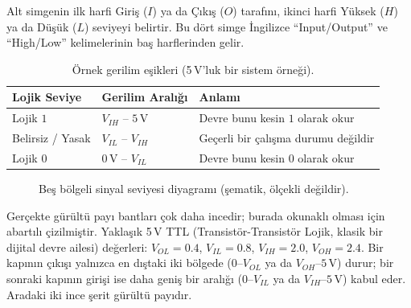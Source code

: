 Alt simgenin ilk harfi Giriş ($I$) ya da Çıkış ($O$) tarafını, ikinci harfi Yüksek ($H$) ya
da Düşük ($L$) seviyeyi belirtir. Bu dört simge İngilizce ``Input/Output'' ve ``High/Low''
kelimelerinin baş harflerinden gelir.

\begin{table}[h]
\centering
\begin{tabular}{lll}
\toprule
Lojik Seviye & Gerilim Aralığı & Anlamı \\
\midrule
Lojik $1$ & $V_{IH}$ -- $5\,\text{V}$ & Devre bunu kesin $1$ olarak okur \\
Belirsiz / Yasak & $V_{IL}$ -- $V_{IH}$ & Geçerli bir çalışma durumu değildir \\
Lojik $0$ & $0\,\text{V}$ -- $V_{IL}$ & Devre bunu kesin $0$ olarak okur \\
\bottomrule
\end{tabular}
\caption{Örnek gerilim eşikleri (5\,V'luk bir sistem örneği).}
\label{tab:gerilim-araliklari}
\end{table}

\begin{figure}[H]
\centering
{}
\caption{Beş bölgeli sinyal seviyesi diyagramı (şematik, ölçekli değildir).}
\label{fig:sinyal-seviyeleri}
\end{figure}

Gerçekte gürültü payı bantları çok daha incedir; burada okunaklı olması için abartılı
çizilmiştir. Yaklaşık 5\,V TTL (Transistör-Transistör Lojik, klasik bir dijital devre
ailesi) değerleri: $V_{OL}=0.4$, $V_{IL}=0.8$, $V_{IH}=2.0$, $V_{OH}=2.4$. Bir kapının
çıkışı yalnızca en dıştaki iki bölgede ($0$--$V_{OL}$ ya da $V_{OH}$--$5\,\text{V}$) durur;
bir sonraki kapının girişi ise daha geniş bir aralığı ($0$--$V_{IL}$ ya da
$V_{IH}$--$5\,\text{V}$) kabul eder. Aradaki iki ince şerit gürültü payıdır.

